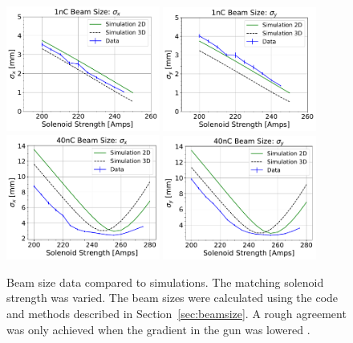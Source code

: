 \begin{figure}
	\includegraphics[width=0.45\textwidth]{images/xbeamsizes_low_charge_sol_scan_11-02-2017}%
	\includegraphics[width=0.45\textwidth]{images/ybeamsizes_low_charge_sol_scan_11-02-2017}\\
	
	
	\includegraphics[width=0.45\textwidth]{images/xbeamsizes_high_charge_sol_scan_10-17-2017}%
	\includegraphics[width=0.45\textwidth]{images/ybeamsizes_high_charge_sol_scan_10-17-2017}
	\caption{Beam size data compared to simulations. The matching solenoid strength was varied. 
	The beam sizes were calculated using the code and methods described in Section~\ref{sec:beamsize}. 
	A rough agreement was only achieved when the gradient in the gun was lowered .}
\label{fig:solscan}
\end{figure}


